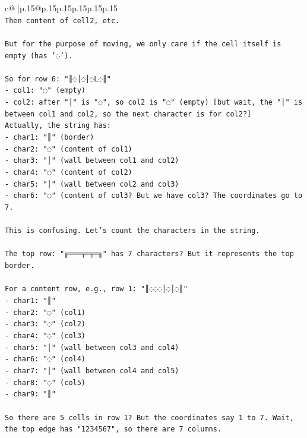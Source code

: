 \documentclass{article}
\begin{document}
{\begin{supertabular}{c@{$\;$}|p{.15\linewidth}@{}p{.15\linewidth}p{.15\linewidth}p{.15\linewidth}p{.15\linewidth}p{.15\linewidth}}
{{{\\ 
\texttt{Then content of cell2, etc.} \\
\\ 
\texttt{But for the purpose of moving, we only care if the cell itself is empty (has '◌').} \\
\\ 
\texttt{So for row 6: "║◌│◌│◌L◌║"} \\
\texttt{{-} col1: "◌" (empty)} \\
\texttt{{-} col2: after "│" is "◌", so col2 is "◌" (empty) {[}but wait, the "│" is between col1 and col2, so the next character is for col2?{]}} \\
\texttt{Actually, the string has:} \\
\texttt{{-} char1: "║" (border)} \\
\texttt{{-} char2: "◌" (content of col1)} \\
\texttt{{-} char3: "│" (wall between col1 and col2)} \\
\texttt{{-} char4: "◌" (content of col2)} \\
\texttt{{-} char5: "│" (wall between col2 and col3)} \\
\texttt{{-} char6: "◌" (content of col3? But we have col3? The coordinates go to 7.} \\
\\ 
\texttt{This is confusing. Let's count the characters in the string.} \\
\\ 
\texttt{The top row: "╔═══╤═╤═╗" has 7 characters? But it represents the top border.} \\
\\ 
\texttt{For a content row, e.g., row 1: "║◌◌◌│◌│◌║"} \\
\texttt{{-} char1: "║"} \\
\texttt{{-} char2: "◌" (col1)} \\
\texttt{{-} char3: "◌" (col2)} \\
\texttt{{-} char4: "◌" (col3)} \\
\texttt{{-} char5: "│" (wall between col3 and col4)} \\
\texttt{{-} char6: "◌" (col4)} \\
\texttt{{-} char7: "│" (wall between col4 and col5)} \\
\texttt{{-} char8: "◌" (col5)} \\
\texttt{{-} char9: "║"} \\
\\ 
\texttt{So there are 5 cells in row 1? But the coordinates say 1 to 7. Wait, the top edge has "1234567", so there are 7 columns.} \\
}}}
\end{supertabular}}
\end{document}
